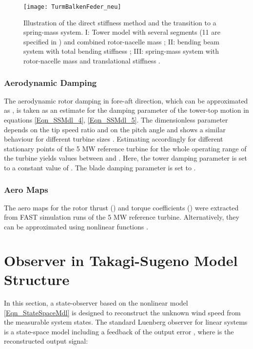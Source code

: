 \documentclass[a4paper]{article}
\begin{document}
\begin{figure}
\centering
\texttt{[image: TurmBalkenFeder\_neu]}
\caption{Illustration of the direct stiffness method and the transition to a spring-mass system. I:
Tower model with several segments (11 are specified in \cite{Jonkman:2009}) and combined rotor-nacelle mass ; II: bending beam system with total
bending stiffness ; III: spring-mass system with rotor-nacelle mass  and translational stiffness .}
\label{Fig_TurmBalkenFeder}
\end{figure}





\subsubsection{\label{Sec_AeroDamping}Aerodynamic Damping}

The aerodynamic rotor damping in fore-aft direction, which can be approximated as 
\newline  \cite{Kaiser:2000}, is taken as an estimate for the damping parameter  of the tower-top motion in equations \eqref{Eqn_SSMdl_4}, \eqref{Eqn_SSMdl_5}. The dimensionless parameter  depends on the tip speed ratio and on the pitch angle and shows a similar behaviour for different turbine sizes \cite{Kaiser:2000}. Estimating  accordingly for different stationary points of the 5 MW reference turbine for the whole operating range of the turbine yields values between
 and .
Here, the tower damping parameter is set to a constant value of . The blade damping parameter is set to .

\subsubsection{\label{Sec_AeroMaps}Aero Maps}

The aero maps for the rotor thrust () and torque coefficients () were extracted from FAST simulation runs of the 5 MW reference turbine.
Alternatively, they can be approximated using nonlinear functions \cite{Georg:Fuzz2012}.


\section{\label{Sec_TSObs}Observer in Takagi-Sugeno Model Structure}

In this section, a state-observer based on the nonlinear model \eqref{Eqn_StateSpaceMdl} is designed to reconstruct the unknown wind speed from the measurable system states. The standard Luenberg observer for linear systems is a state-space model including a feedback of the output error , where  is the reconstructed output signal:
\end{document}
